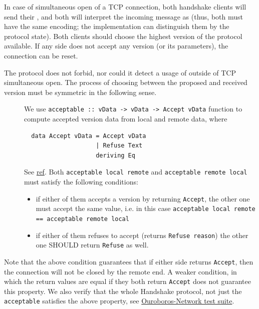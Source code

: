 In case of simultaneous open of a TCP connection, both handshake clients will
send their \MsgProposeVersions{}, and both will interpret the incoming message as
\MsgReplyVersions{} (thus, both must have the same encoding; the implementation
can distinguish them by the protocol state).  Both clients should choose the
highest version of the protocol available.  If any side does not accept any
version (or its parameters), the connection can be reset.

The protocol does not forbid, nor could it detect a usage of
\MsgReplyVersions{} outside of TCP simultaneous open.  The process of
choosing between the proposed and received version must be symmetric in the
following sense.

\begin{description}
  \item[]
    We use \texttt{acceptable :: vData -> vData -> Accept vData}
    function to compute accepted version data from local and remote data,
    where
\begin{verbatim}
  data Accept vData = Accept vData
                    | Refuse Text
                    deriving Eq
\end{verbatim}
    See
    \href{https://ouroboros-network.cardano.intersectmbo.org/ouroboros-network/framework/Ouroboros-Network-Protocol-Handshake-Version.html#t:Acceptable}{ref}.
    Both \texttt{acceptable local remote} and \texttt{acceptable remote local}
    must satisfy the following conditions:
    \begin{itemize}
      \item if either of them accepts a version by returning \texttt{Accept},
        the other one must accept the same value, i.e. in this case
        \texttt{acceptable local remote == acceptable remote local}
      \item if either of them refuses to accept (returns \texttt{Refuse reason})
        the other one SHOULD return \texttt{Refuse} as well.
    \end{itemize}
\end{description}
Note that the above condition guarantees that if either side returns
\texttt{Accept}, then the connection will not be closed by the remote end.
A weaker condition, in which the return values are equal if they both return
\texttt{Accept} does not guarantee this property.  We also verify that the
whole Handshake protocol, not just the \texttt{acceptable} satisfies the above
property, see
\href{https://github.com/intersectmbo/ouroboros-network/blob/master/ouroboros-network/protocols/tests-lib/Ouroboros/Network/Protocol/Handshake/Test.hs}{Ouroboros-Network
test suite}.

